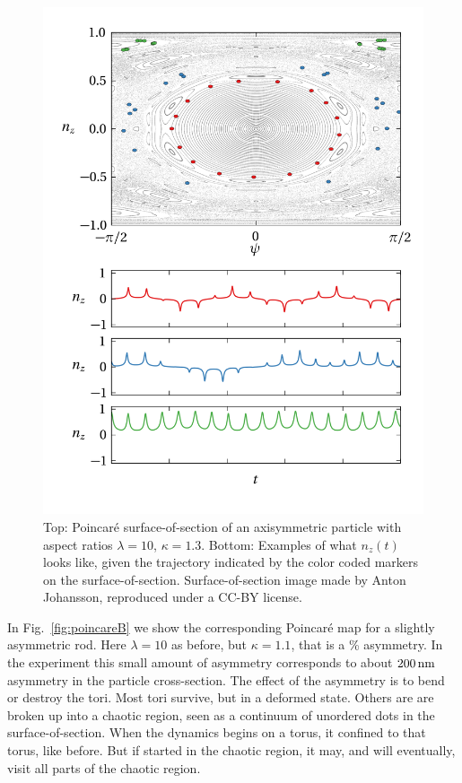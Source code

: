 \documentclass[thesis.tex]{subfiles}
\begin{document}
\begin{figure}
\includegraphics[width=12cm]{figs/poincareC.png}%
\caption{\label{fig:poincareC} Top: Poincar\'e surface-of-section of an axisymmetric particle with aspect ratios $\lambda=10$, $\kappa=1.3$. Bottom: Examples of what $n_z(t)$ looks like, given the trajectory indicated by the color coded markers on the surface-of-section. Surface-of-section image made by Anton Johansson, reproduced under a CC-BY license.}%
\end{figure}

In Fig.~\ref{fig:poincareB} we show the corresponding Poincar\'e map for a slightly asymmetric rod. Here $\lambda=10$ as before, but $\kappa = 1.1$, that is a \unit[10]{\%} asymmetry. In the experiment this small amount of asymmetry corresponds to about $\unit[200]{nm}$ asymmetry in the particle cross-section. The effect of the asymmetry is to bend or destroy the tori. Most tori survive, but in a deformed state. Others are are broken up into a chaotic region, seen as a continuum of unordered dots in the surface-of-section. When the dynamics begins on a torus, it confined to that torus, like before. But if started in the chaotic region, it may, and will eventually, visit all parts of the chaotic region.
\end{document}

